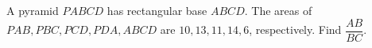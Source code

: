 A pyramid $PABCD$ has rectangular base $ABCD$. The areas of $PAB,PBC,PCD,PDA,ABCD$ are $10,13,11,14,6$, respectively. Find $\dfrac{AB}{BC}$.
